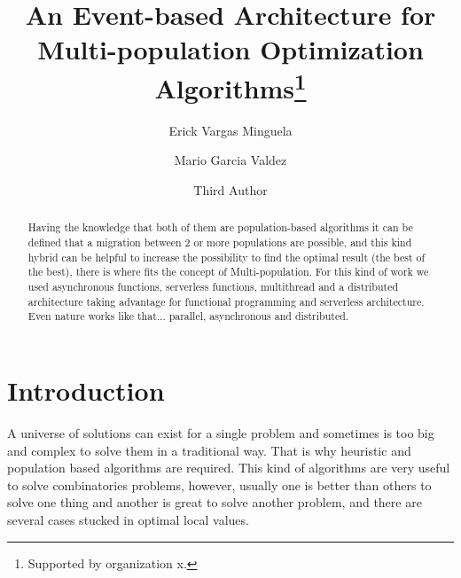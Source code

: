\documentclass[runningheads]{llncs}
\begin{document}
%
\title{An Event-based Architecture for Multi-population Optimization Algorithms\thanks{Supported by organization x.}}
%
%
\author{Erick Vargas Minguela \and
Mario Garcia Valdez \and
Third Author}
%
%
%
\maketitle              %
%
\begin{abstract}
    Having the knowledge that both of them are population-based algorithms it can be
    defined that a migration between 2 or more populations are possible, and this kind
    hybrid can be helpful to increase the possibility to find the optimal result (the best
    of the best), there is where fits the concept of Multi-population.
    For this kind of work we used asynchronous functions, serverless functions,
multithread and a distributed architecture taking advantage for functional
programming and serverless architecture.
Even nature works like that... parallel, asynchronous and distributed.



\end{abstract}
%
%
%
\section{Introduction}
A universe of solutions can exist for a single problem and sometimes is too big and complex 
to solve them in a traditional way. That is why heuristic and population based algorithms are required. This kind
of algorithms are very useful to solve combinatories problems, however, usually one is better than others 
to solve one thing and another is great to solve another problem, and there are several cases 
stucked in optimal local values.
\end{document}
